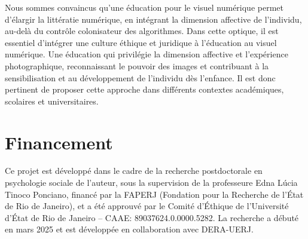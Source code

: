 \documentclass[final,fra]{anthology-ch}         %
\begin{document}
Nous sommes convaincus qu'une éducation pour le visuel numérique permet d'élargir la littératie numérique, en intégrant la dimension affective de l'individu, au-delà du contrôle colonisateur des algorithmes. Dans cette optique, il est essentiel d'intégrer une culture éthique et juridique à l'éducation au visuel numérique. Une éducation qui privilégie la dimension affective et l'expérience photographique, reconnaissant le pouvoir des images et contribuant à la sensibilisation et au développement de l'individu dès l'enfance. Il est donc pertinent de proposer cette approche dans différents contextes académiques, scolaires et universitaires.

\section*{Financement}

Ce projet est développé dans le cadre de la recherche postdoctorale en psychologie sociale de l'auteur, sous la supervision de la professeure Edna Lúcia Tinoco Ponciano, financé par la FAPERJ (Fondation pour la Recherche de l'État de Rio de Janeiro), et a été approuvé par le Comité d'Éthique de l'Université d'État de Rio de Janeiro – CAAE: 89037624.0.0000.5282. La recherche a débuté en mars 2025 et est développée en collaboration avec DERA-UERJ.

\printbibliography
\end{document}
